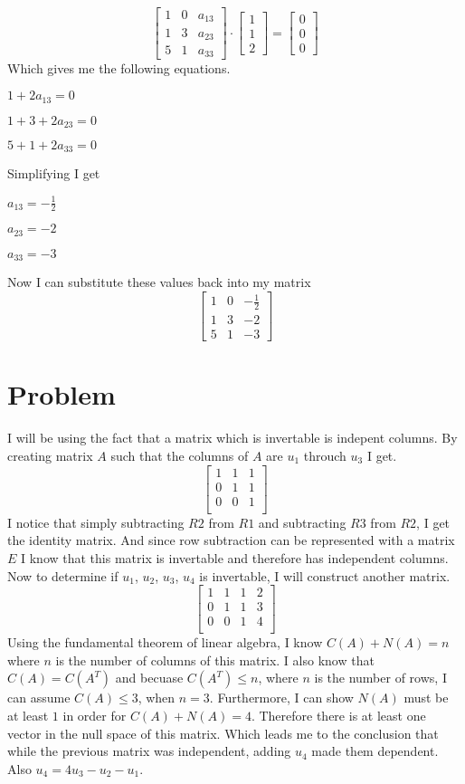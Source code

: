 \documentclass{article}
\begin{document}
\[
\begin{bmatrix}
1 & 0 & a_{13} \\
1 & 3 & a_{23} \\
5 & 1 & a_{33} 
\end{bmatrix}
\cdot
\begin{bmatrix}
1 \\
1 \\
2 
\end{bmatrix}
=
\begin{bmatrix}
0 \\
0 \\
0 
\end{bmatrix}
\]
Which gives me the following equations.

$1 + 2a_{13} = 0$

$1 + 3 + 2a_{23} = 0$

$5 + 1 + 2a_{33} = 0$

Simplifying I get

$a_{13} = -\frac{1}{2}$

$a_{23} = -2$

$a_{33} = -3$

Now I can substitute these values back into my matrix
\[
\begin{bmatrix}
1 & 0 & -\frac{1}{2} \\
1 & 3 & -2 \\
5 & 1 & -3 
\end{bmatrix}
\]
\section{Problem}
I will be using the fact that a matrix which is invertable is indepent columns. By creating matrix $A$ such that the columns of $A$ are $u_{1}$ throuch $u_{3}$ I get.
\[
\begin{bmatrix}
1 & 1 & 1 \\
0 & 1 & 1 \\
0 & 0 & 1 \\
\end{bmatrix}
\]
I notice that simply subtracting $R2$ from $R1$ and subtracting $R3$ from $R2$, I get the identity matrix. And since row subtraction can be represented with a matrix $E$ I know that this matrix is invertable and therefore has independent columns.
Now to determine if $u_{1}$, $u_{2}$, $u_{3}$, $u_{4}$ is invertable, I will construct another matrix.
\[
\begin{bmatrix}
1 & 1 & 1 & 2 \\
0 & 1 & 1 & 3 \\
0 & 0 & 1 & 4 \\
\end{bmatrix}
\]
Using the fundamental theorem of linear algebra, I know $C(A) + N(A) = n$ where $n$ is the number of columns of this matrix. I also know that $C(A) = C(A^{T})$ and becuase $C(A^{T}) \le n$, where $n$ is the number of rows, I can assume $C(A) \le 3$, when $n = 3$. Furthermore, I can show $N(A)$ must be at least $1$ in order for $C(A) + N(A) = 4$. Therefore there is at least one vector in the null space of this matrix. Which leads me to the conclusion that while the previous matrix was independent, adding $u_{4}$ made them dependent. Also $u_{4} = 4u_{3} - u_{2} - u_{1}$.
\end{document}
